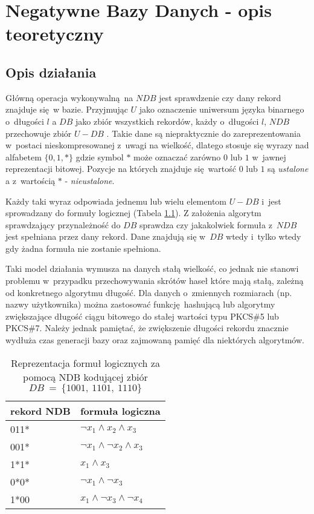 \chapter{Negatywne Bazy Danych - opis teoretyczny}
\label{chp:theory}
\section{Opis działania}
Główną operacja wykonywalną na $NDB$ jest sprawdzenie czy dany rekord znajduje się w bazie. Przyjmując $U$ 
jako oznaczenie uniwersum języka binarnego o~długości $l$ a $DB$ jako zbiór wszystkich rekordów, każdy o~długości $l$,
$NDB$ przechowuje zbiór $U - DB$ \cite{NRI-Esponda}. Takie dane są niepraktycznie do zareprezentowania w~postaci nieskompresowanej z~uwagi na wielkość, dlatego
stosuje się wyrazy nad alfabetem $\{0,1,*\}$ gdzie symbol $*$ może oznaczać zarówno $0$ lub $1$ w~jawnej reprezentacji bitowej.
Pozycje na których znajduje się wartość $0$ lub $1$ są \textit{ustalone} a z~wartością $*$ - \textit{nieustalone}.

Każdy taki wyraz odpowiada jednemu lub wielu elementom $U - DB$ i~jest sprowadzany do formuły logicznej (Tabela \ref{Tbl:NDB-logform}).
Z założenia algorytm sprawdzający przynależność do $DB$ sprawdza czy jakakolwiek formuła z~$NDB$ jest spełniana przez dany rekord. 
Dane znajdują się w~$DB$ wtedy i~tylko wtedy gdy żadna formuła nie zostanie spełniona. 

Taki model działania wymusza na danych stałą wielkość,
co jednak nie stanowi problemu w~przypadku przechowywania skrótów haseł które mają stałą, zależną od konkretnego algorytmu długość.
Dla danych o~zmiennych rozmiarach (np. nazwy użytkownika) można zastosować funkcję hashującą lub algorytmy zwiększające długość ciągu bitowego do stałej wartości typu PKCS\#5 lub PKCS\#7.
Należy jednak pamiętać, że zwiększenie długości rekordu znacznie wydłuża czas generacji bazy oraz zajmowaną pamięć dla niektórych algorytmów. 

\begin{table}[h]
    \centering

    \begin{tabular}{|l|l|}
    	\hline
    	rekord NDB & formuła logiczna                      \\ \hline
    	011*       & $ \neg x_1 \land x_2 \land x_3$       \\ \hline
    	001*       & $ \neg x_1 \land \neg x_2 \land x_3 $ \\ \hline
    	1*1*       & $x_1 \land x_3 $                      \\ \hline
    	0*0*       & $\neg x_1 \land \neg x_3 $            \\ \hline
    	1*00       & $x_1 \land \neg x_3 \land  \neg x_4$  \\ \hline
    \end{tabular}
    
    \caption{Reprezentacja formuł logicznych za pomocą NDB kodującej zbiór $DB~=~\{1001,~1101,~1110\}$}
    \label{Tbl:NDB-logform}
\end{table}


